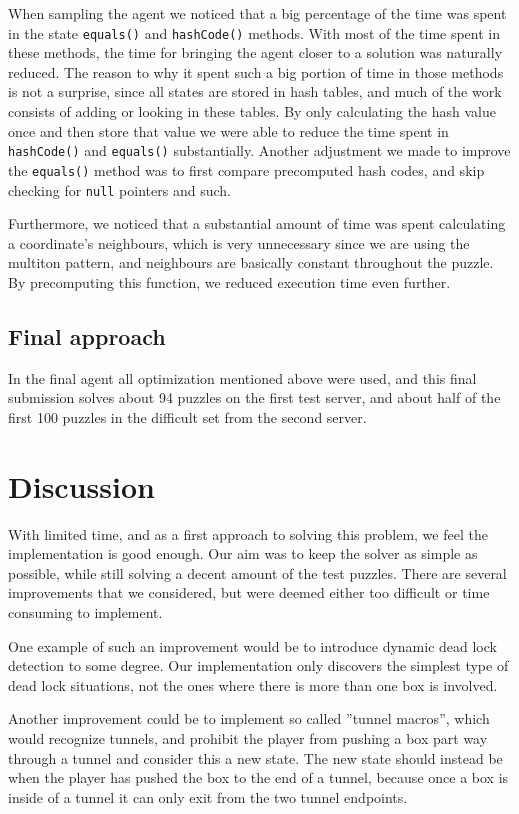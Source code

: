 \documentclass[a4paper,11pt]{article}
\begin{document}
When sampling the agent we noticed that a big percentage of the time was spent in the state \verb!equals()! and \verb!hashCode()! methods. 
With most of the time spent in these methods, the time for bringing the agent closer to a solution
was naturally reduced.
The reason to why it spent such a big portion of time in those methods is not a surprise,
since all states are stored in hash tables, and much of the work consists of
adding or looking in these tables.
By only calculating the hash value once and then store that value
we were able to reduce the time spent in \verb!hashCode()! and \verb!equals()! substantially.
Another adjustment we made to improve the \verb!equals()! method was to first compare precomputed hash codes,
and skip checking for \verb!null! pointers and such.

Furthermore, we noticed that a substantial amount of time was spent calculating
a coordinate's neighbours, which is very unnecessary since
we are using the multiton pattern, and neighbours are basically constant throughout the puzzle.
By precomputing this function, we reduced execution time even further.

\subsection{Final approach}
In the final agent all optimization mentioned above were used,
and this final submission solves about 94 puzzles on the first test server,
and about half of the first 100 puzzles in the difficult set from the second server.

\section{Discussion}

With limited time, and as a first approach to solving this problem,
we feel the implementation is good enough.
Our aim was to keep the solver as simple as possible,
while still solving a decent amount of the test puzzles.
There are several improvements that we considered, but were
deemed either too difficult or time consuming to implement.

One example of such an improvement would be to introduce dynamic
dead lock detection to some degree.
Our implementation only discovers the simplest type of dead lock situations,
not the ones where there is more than one box is involved.

Another improvement could be to implement so called ''tunnel macros'',
which would recognize tunnels, and prohibit the player
from pushing a box part way through a tunnel and consider this a new state.
The new state should instead be when the player has pushed the box to the end of a tunnel,
because once a box is inside of a tunnel it can only exit from the two tunnel endpoints.
\end{document}
